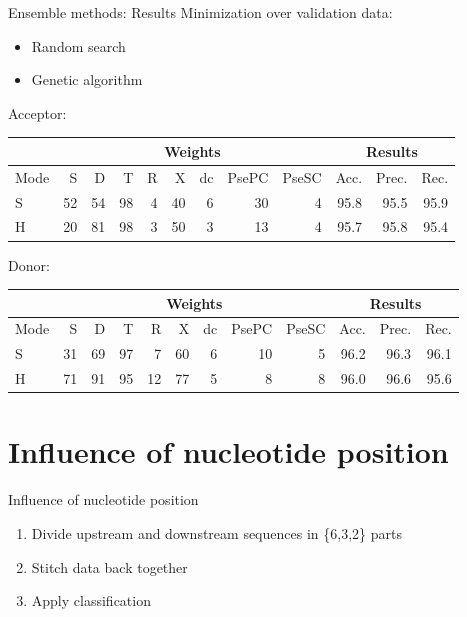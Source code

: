 \documentclass[10pt]{beamer}
\begin{document}
\begin{frame}{Ensemble methods: Results}
	Minimization over validation data:
	\begin{itemize}
		\item Random search
		\item Genetic algorithm
	\end{itemize}
	\pause
	
	Acceptor:
	\vspace{0.2cm}
	\begingroup
	\scriptsize
	\centering
	\def\arraystretch{1.1}
	\begin{tabular}{|l|r|r|r|r|r|r|r|r|r|r|r|}
		\hline
		& \multicolumn{8}{c|}{Weights} & \multicolumn{3}{c|}{Results}\\
		\hline
		Mode & S & D & T & R & X & dc & PsePC & PseSC & Acc. & Prec. & Rec.  \\
		\hline
		S& 52 & 54 & 98 & 4 & 40 & 6 & 30 & 4 & 95.8 & 95.5 & 95.9\\
		H& 20 & 81 & 98 & 3 & 50 & 3 & 13 & 4 & 95.7 & 95.8 & 95.4\\	
		
		
		\hline 
	\end{tabular}
	\endgroup
	\vspace{0.2cm}
	
	Donor:
	
	\vspace{0.2cm}
	
	\begingroup
	\scriptsize
	\centering
	\def\arraystretch{1.1}
	\begin{tabular}{|l|r|r|r|r|r|r|r|r|r|r|r|}
		\hline
		& \multicolumn{8}{c|}{Weights} & \multicolumn{3}{c|}{Results}\\
		\hline
		Mode & S & D & T & R & X & dc & PsePC & PseSC & Acc. & Prec. & Rec.  \\
		\hline
		S& 31 & 69 & 97 & 7 & 60 & 6 & 10 & 5 & 96.2 & 96.3 & 96.1\\
		H& 71 & 91 & 95 & 12 & 77 & 5 & 8 & 8 & 96.0 & 96.6 & 95.6\\	
		
		
		\hline 
	\end{tabular}
	\endgroup
	
\end{frame}

\section{Influence of nucleotide position}
\begin{frame}{Influence of nucleotide position}
	\begin{enumerate}
		\item Divide upstream and downstream sequences in \{6,3,2\} parts
		\item Stitch data back together
		\item Apply classification
	\end{enumerate}
\end{frame}
\end{document}
